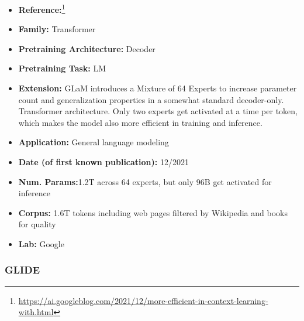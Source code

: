 \documentclass{article}
\begin{document}
            \begin{itemize}
                \item \textbf{Reference:}\footnote{\url{https://ai.googleblog.com/2021/12/more-efficient-in-context-learning-with.html}}\cite{du2022glam}
                \item \textbf{Family:} Transformer 
                \item \textbf{Pretraining Architecture:} Decoder
                \item \textbf{Pretraining Task:} LM
                \item \textbf{Extension:} GLaM introduces a Mixture of 64 Experts to increase parameter count and generalization properties in a somewhat standard decoder-only. Transformer architecture. Only two experts get activated at a time per token, which makes the model also more efficient in training and inference.  
                \item \textbf{Application:} General language modeling
                \item \textbf{Date (of first known publication):} 12/2021
                \item \textbf{Num. Params:}1.2T across 64 experts, but only 96B get activated for inference
                \item \textbf{Corpus:} 1.6T tokens including web pages filtered by Wikipedia and books for quality
                \item \textbf{Lab:} Google
            \end{itemize}

            
\subsubsection{GLIDE}
\end{document}
